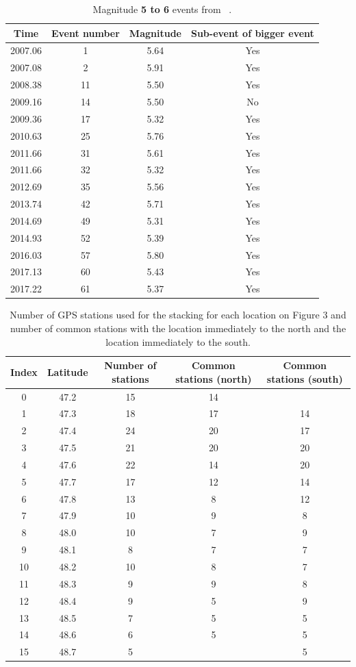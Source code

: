 \documentclass{article}
\begin{document}
 \begin{table}[hbt!]
 \caption{Magnitude \textbf{5 to 6} events from ~\citet{MIC_2019}.}
 \centering
 \begin{tabular}{c c c c}
 \hline
 Time & Event number & Magnitude & Sub-event of bigger event \\
 \hline
 2007.06 & 1 & 5.64 & Yes \\
 2007.08 & 2 & 5.91 & Yes \\
 2008.38 & 11 & 5.50 & Yes \\
 2009.16 & 14 & 5.50 & No \\
 2009.36 & 17 & 5.32 & Yes \\
 2010.63 & 25 & 5.76 & Yes \\
 2011.66 & 31 & 5.61 & Yes \\
 2011.66 & 32 & 5.32 & Yes \\
 2012.69 & 35 & 5.56 & Yes \\
 2013.74 & 42 & 5.71 & Yes \\
 2014.69 & 49 & 5.31 & Yes \\
 2014.93 & 52 & 5.39 & Yes \\
 2016.03 & 57 & 5.80 & Yes \\
 2017.13 & 60 & 5.43 & Yes \\
 2017.22 & 61 & 5.37 & Yes \\
 \hline
 \end{tabular}
 \end{table}

 \begin{table}[hbt!]
 \caption{Number of GPS stations used for the stacking for each location on Figure 3 and number of common stations with the location immediately to the north and the location immediately to the south.}
 \centering
 \begin{tabular}{c c c c c}
 \hline
 Index & Latitude & Number of stations & Common stations (north) & Common stations (south) \\
 \hline
0 & 47.2 & 15 & 14 & \\
1 & 47.3 & 18 & 17 & 14 \\
2 & 47.4 & 24 & 20 & 17 \\
3 & 47.5 & 21 & 20 & 20 \\
4 & 47.6 & 22 & 14 & 20 \\
5 & 47.7 & 17 & 12 & 14 \\
6 & 47.8 & 13 & 8 & 12 \\
7 & 47.9 & 10 & 9 & 8 \\
8 & 48.0 & 10 & 7 & 9 \\
9 & 48.1 & 8 & 7 & 7 \\
10 & 48.2 & 10 & 8 & 7 \\
11 & 48.3 & 9 & 9 & 8 \\
12 & 48.4 & 9 & 5 & 9 \\
13 & 48.5 & 7 & 5 & 5 \\
14 & 48.6 & 6 & 5 & 5 \\
15 & 48.7 & 5 & & 5 \\
 \hline
 \end{tabular}
 \end{table}
\end{document}
